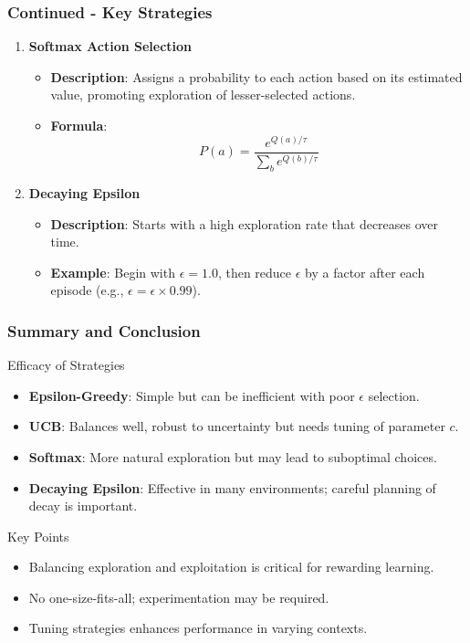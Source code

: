 \documentclass[aspectratio=169]{beamer}
\begin{document}
\begin{frame}[fragile]
    \frametitle{Continued - Key Strategies}
    \begin{enumerate}[resume]
        \item \textbf{Softmax Action Selection}
            \begin{itemize}
                \item \textbf{Description}: Assigns a probability to each action based on its estimated value, promoting exploration of lesser-selected actions.
                \item \textbf{Formula}:
                \begin{equation}
                    P(a) = \frac{e^{Q(a)/\tau}}{\sum_{b} e^{Q(b)/\tau}}
                \end{equation}
            \end{itemize}
        \item \textbf{Decaying Epsilon}
            \begin{itemize}
                \item \textbf{Description}: Starts with a high exploration rate that decreases over time.
                \item \textbf{Example}: Begin with $\epsilon = 1.0$, then reduce $\epsilon$ by a factor after each episode (e.g., $\epsilon = \epsilon \times 0.99$).
            \end{itemize}
    \end{enumerate}
\end{frame}

\begin{frame}[fragile]
    \frametitle{Summary and Conclusion}
    \begin{block}{Efficacy of Strategies}
        \begin{itemize}
            \item \textbf{Epsilon-Greedy}: Simple but can be inefficient with poor $\epsilon$ selection.
            \item \textbf{UCB}: Balances well, robust to uncertainty but needs tuning of parameter $c$.
            \item \textbf{Softmax}: More natural exploration but may lead to suboptimal choices.
            \item \textbf{Decaying Epsilon}: Effective in many environments; careful planning of decay is important.
        \end{itemize}
    \end{block}
    \begin{block}{Key Points}
        \begin{itemize}
            \item Balancing exploration and exploitation is critical for rewarding learning.
            \item No one-size-fits-all; experimentation may be required.
            \item Tuning strategies enhances performance in varying contexts.
        \end{itemize}
    \end{block}
\end{frame}
\end{document}
